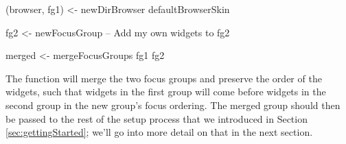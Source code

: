\begin{haskellcode}
 (browser, fg1) <- newDirBrowser defaultBrowserSkin

 fg2 <- newFocusGroup
 -- Add my own widgets to fg2

 merged <- mergeFocusGroups fg1 fg2
\end{haskellcode}

The  function will merge the two focus groups and
preserve the order of the widgets, such that widgets in the first
group will come before widgets in the second group in the new group's
focus ordering.  The merged group should then be passed to the rest of
the setup process that we introduced in Section
\ref{sec:gettingStarted}; we'll go into more detail on that in the
next section.
